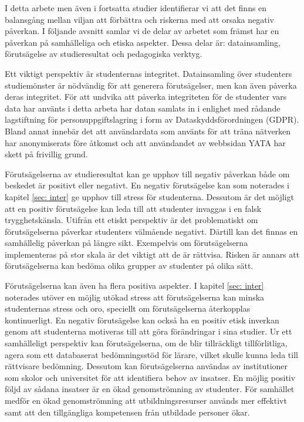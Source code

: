 I detta arbete men även i fortsatta studier identifierar vi att det finns en balansgång mellan viljan att förbättra och riskerna med att orsaka negativ påverkan. I följande avsnitt samlar vi de delar av arbetet som främst har en påverkan på samhälleliga och etiska aspekter. Dessa delar är: datainsamling, förutsägelse av studieresultat och pedagogiska verktyg. 


Ett viktigt perspektiv är studenternas integritet. Datainsamling över studenters studiemönster är nödvändig för att generera förutsägelser, men kan även påverka deras integritet. För att undvika att påverka integriteten för de studenter vars data har använts i detta arbeta har datan samlats in i enlighet med rådande lagstiftning för personuppgiftslagring i form av Dataskyddsförordningen (GDPR). Bland annat innebär det att användardata som använts för att träna nätverken har anonymiserats före åtkomst och att användandet av webbsidan YATA har skett på frivillig grund. 

Förutsägelserna av studieresultat kan ge upphov till negativ påverkan både om beskedet är positivt eller negativt. En negativ förutsägelse kan som noterades i kapitel \ref{sec: inter} ge upphov till stress för studenterna. Dessutom är det möjligt att en positiv förutsägelse kan leda till att studenter invaggas i en falsk trygghetskänsla. Utifrån ett etiskt perspektiv är det problematiskt om förutsägelserna påverkar studenters välmående negativt. Därtill kan det finnas en samhällelig påverkan på längre sikt. Exempelvis om förutsägelserna implementeras på stor skala är det viktigt att de är rättvisa. Risken är annars att förutsägelserna kan bedöma olika grupper av studenter på olika sätt. 

Förutsägelserna kan även ha flera positiva aspekter. I kapitel \ref{sec: inter} noterades utöver en möjlig utökad stress att förutsägelserna kan minska studenternas stress och oro, speciellt om förutsägelserna återkopplas kontinuerligt. En negativ förutsägelse kan också ha en positiv etisk inverkan genom att studenterna motiveras till att göra förändringar i sina studier. Ur ett samhälleligt perspektiv kan förutsägelserna, om de blir tillräckligt tillförlitliga, agera som ett databaserat bedömningsstöd för lärare, vilket skulle kunna leda till rättvisare bedömning. Dessutom kan förutsägelserna användas av institutioner som skolor och universitet för att identifiera behov av insatser. En möjlig positiv följd av sådana insatser är en ökad genomströmning av studenter. För samhället medför en ökad genomströmning att utbildningsresurser används mer effektivt samt att den tillgängliga kompetensen från utbildade personer ökar. 

